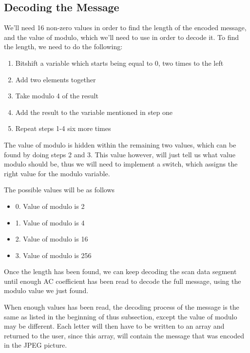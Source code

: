 \subsection*{Decoding the Message}
We'll need 16 non-zero values in order to find the length of the encoded message, and the value of modulo, which we'll need to use in order to decode it. To find the length, we need to do the following:
\begin{enumerate}
	\item Bitshift a variable which starts being equal to 0, two times to the left
	\item Add two elements together
	\item Take modulo 4 of the result
	\item Add the result to the variable mentioned in step one
	\item Repeat steps 1-4 six more times
\end{enumerate}
The value of modulo is hidden within the remaining two values, which can be found by doing steps 2 and 3. This value however, will just tell us what value modulo should be, thus we will need to implement a switch, which assigns the right value for the modulo variable.

The possible values will be as follows
\begin{itemize}
	\item 0. Value of modulo is 2
	\item 1. Value of modulo is 4
	\item 2. Value of modulo is 16
	\item 3. Value of modulo is 256
\end{itemize}
Once the length has been found, we can keep decoding the scan data segment until enough AC coefficient has been read to decode the full message, using the modulo value we just found.

When enough values has been read, the decoding process of the message is the same as listed in the beginning of thus subsection, except the value of modulo may be different. 
Each letter will then have to be written to an array and returned to the user, since this array, will contain the message that was encoded in the JPEG picture.